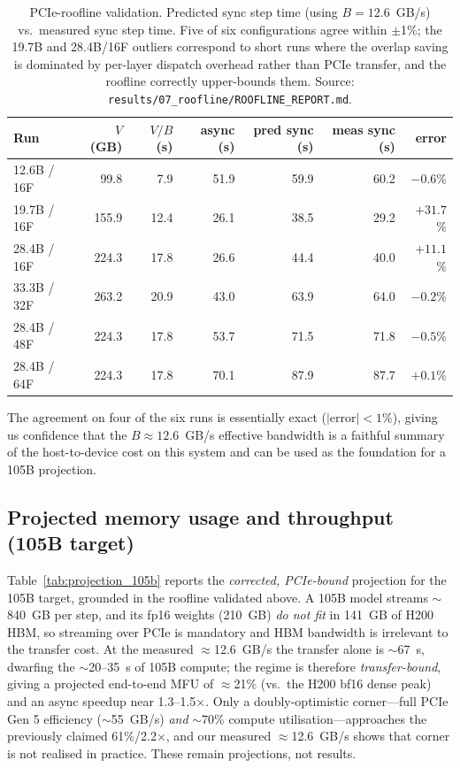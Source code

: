 \documentclass[11pt, letterpaper]{article}
\begin{document}
\begin{table}[h]
\centering
\small
\begin{tabular}{lrrrrrr}
\toprule
\textbf{Run} & \textbf{$V$ (GB)} & \textbf{$V/B$ (s)} & \textbf{async (s)} & \textbf{pred sync (s)} & \textbf{meas sync (s)} & \textbf{error} \\
\midrule
12.6B / 16F & 99.8  & 7.9  & 51.9 & 59.9 & 60.2 & $-0.6$\% \\
19.7B / 16F & 155.9 & 12.4 & 26.1 & 38.5 & 29.2 & $+31.7$\% \\
28.4B / 16F & 224.3 & 17.8 & 26.6 & 44.4 & 40.0 & $+11.1$\% \\
33.3B / 32F & 263.2 & 20.9 & 43.0 & 63.9 & 64.0 & $-0.2$\% \\
28.4B / 48F & 224.3 & 17.8 & 53.7 & 71.5 & 71.8 & $-0.5$\% \\
28.4B / 64F & 224.3 & 17.8 & 70.1 & 87.9 & 87.7 & $+0.1$\% \\
\bottomrule
\end{tabular}
\caption{PCIe-roofline validation. Predicted sync step time (using $B = 12.6$~GB/s) vs.\ measured sync step time. Five of six configurations agree within $\pm$1\%; the 19.7B and 28.4B/16F outliers correspond to short runs where the overlap saving is dominated by per-layer dispatch overhead rather than PCIe transfer, and the roofline correctly upper-bounds them. Source: \texttt{results/07\_roofline/ROOFLINE\_REPORT.md}.}
\label{tab:roofline_validation}
\end{table}

The agreement on four of the six runs is essentially exact ($|\text{error}| < 1\%$), giving us confidence that the $B \approx 12.6$~GB/s effective bandwidth is a faithful summary of the host-to-device cost on this system and can be used as the foundation for a 105B projection.

\subsection{Projected memory usage and throughput (105B target)}
Table~\ref{tab:projection_105b} reports the \emph{corrected, PCIe-bound} projection for the 105B target, grounded in the roofline validated above. A 105B model streams $\sim$840~GB per step, and its fp16 weights (210~GB) \emph{do not fit} in 141~GB of H200 HBM, so streaming over PCIe is mandatory and HBM bandwidth is irrelevant to the transfer cost. At the measured $\approx$12.6~GB/s the transfer alone is $\sim$67~s, dwarfing the $\sim$20--35~s of 105B compute; the regime is therefore \emph{transfer-bound}, giving a projected end-to-end MFU of $\approx$21\% (vs.\ the H200 bf16 dense peak) and an async speedup near 1.3--1.5$\times$. Only a doubly-optimistic corner---full PCIe Gen 5 efficiency ($\sim$55~GB/s) \emph{and} $\sim$70\% compute utilisation---approaches the previously claimed 61\%/2.2$\times$, and our measured $\approx$12.6~GB/s shows that corner is not realised in practice. These remain projections, not results.
\end{document}
